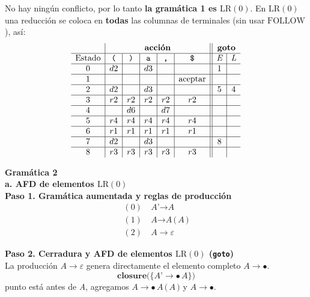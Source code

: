 \documentclass[12pt,letterpaper]{article}
\newcommand{\nt}[1]{\textit{#1}}
\newcommand{\tk}[1]{\texttt{#1}}
\newcommand{\lrc}{\mathrm{LR(0)}}
\newcommand{\eps}{\varepsilon}
\begin{document}
\begin{enumerate}[label=\arabic*.]
  No hay ningún conflicto, por lo tanto \textbf{la gramática 1 es $\lrc$}. En $\lrc$ una reducción se coloca en
  \textbf{todas} las columnas de terminales (sin usar $\mathrm{FOLLOW}$), así:
  \[
  \begin{array}{c|c|c|c|c|c||c|c}
    & \multicolumn{5}{c||}{\textbf{acción}} & \multicolumn{2}{c}{\textbf{goto}} \\ \hline
    \text{Estado} & \tk{(} & \tk{)} & \tk{a} & \tk{,} & \tk{\$} & \nt{E} & \nt{L} \\ \hline
    0 & d2 &    & d3 &    &    & 1 &   \\ \hline
    1 &    &    &    &    & \text{aceptar} &   &   \\ \hline
    2 & d2 &    & d3 &    &    & 5 & 4 \\ \hline
    3 & r2 & r2 & r2 & r2 & r2 &   &   \\ \hline
    4 &    & d6 &    & d7 &    &   &   \\ \hline
    5 & r4 & r4 & r4 & r4 & r4 &   &   \\ \hline
    6 & r1 & r1 & r1 & r1 & r1 &   &   \\ \hline
    7 & d2 &    & d3 &    &    & 8 &   \\ \hline
    8 & r3 & r3 & r3 & r3 & r3 &   &   \\
  \end{array}
  \]


  \newpage

  \textbf{\Large Gramática 2}\\

  \textbf{\large a. AFD de elementos $\lrc$}\\

  \textbf{Paso 1. Gramática aumentada y reglas de producción}
  \[
  \begin{aligned}
    (0)\ & \nt{A'} \to \nt{A} \\
    (1)\ & \nt{A} \to \nt{A}\,\tk{(}\,\nt{A}\,\tk{)} \\
    (2)\ & \nt{A} \to \eps
  \end{aligned}
  \]

  \textbf{Paso 2. Cerradura y AFD de elementos $\lrc$ (\texttt{goto})}\\
  La producción $\nt{A}\to\eps$ genera directamente el elemento completo $\nt{A}\to\bullet$.\\

  \[
  \textbf{closure}\big(\{\nt{A'}\to\bullet\,\nt{A}\}\big)
  \]
  punto está antes de \nt{A}, agregamos $\nt{A}\to\bullet\,\nt{A}\,\tk{(}\,\nt{A}\,\tk{)}$ y $\nt{A}\to\bullet$.


\end{enumerate}
\end{document}
